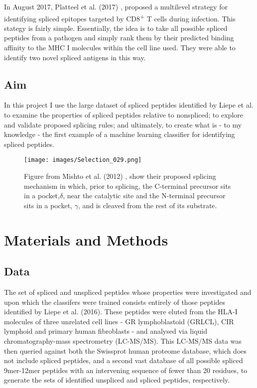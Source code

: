 \documentclass[10pt,a4paper,twoside,twocolumn]{article}
\begin{document}
In August 2017, Platteel et al. (2017) \cite{Platteel2017}, proposed a multilevel strategy for identifying spliced epitopes targeted by CD8\textsuperscript{+} T cells during infection. This stategy is fairly simple. Essentially, the idea is to take all possible spliced peptides from a pathogen and simply rank them by their predicted binding affinity to the MHC I molecules within the cell line used. They were able to identify two novel spliced antigens in this way.

\subsection*{Aim}

In this project I use the large dataset of spliced peptides identified by Liepe et al. to examine the properties of spliced peptides relative to nonspliced; to explore and validate proposed splicing rules; and ultimately, to create what is - to my knowledge - the first example of a machine learning classifier for identifying spliced peptides.

\begin{figure}
	\centering
	\texttt{[image: images/Selection\_029.png]}
	\caption{Figure from Mishto et al. (2012) \cite{Mishto2012}, show their proposed splicing mechanism in which, prior to splicing, the C-terminal precursor sits in a pocket,$ \delta$, near the catalytic site and the N-terminal precursor sits in a pocket, $\gamma$, and is cleaved from the rest of its substrate.}
	\label{pocket}
\end{figure}
	


\section*{Materials and Methods}


\subsection*{Data}
The set of spliced and unspliced peptides  whose properties were investigated and upon which the classifers were trained consists entirely of those peptides identified by Liepe et al. (2016). These peptides were eluted from the HLA-I molecules of three unrelated cell lines - GR lymphoblastoid (GRLCL), CIR lymphoid \cite{Caron2015} and primary human fibroblasts \cite{Bassani-Sternberg2015} - and analysed via liquid chromatography-mass spectrometry (LC-MS/MS). This LC-MS/MS data was then queried against both the Swissprot human proteome database, which does not include spliced peptides, and a second vast database of all possible spliced 9mer-12mer peptides with an intervening sequence of fewer than 20 residues, to generate the sets of identified unspliced and spliced peptides, respectively.
\end{document}
